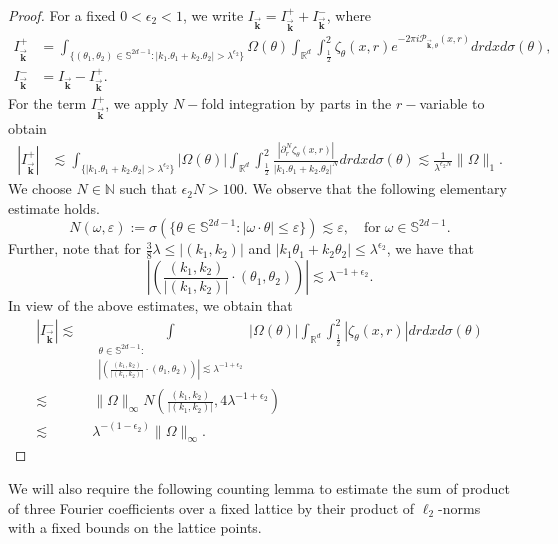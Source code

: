 \documentclass[a4paper,reqno]{amsart}
\newcommand{\R}{{\mathbb R}}       %
\newcommand{\N}{{\mathbb N}}
\newcommand{\Sp}{{\mathbb S}}
\theoremstyle{definition}
\numberwithin{equation}{section}
\begin{document}
\begin{proof}
	For a fixed $0<\epsilon_2<1$, we write $I_{\vec{\mathbf{k}}}=I_{\vec{\mathbf{k}}}^++I_{\vec{\mathbf{k}}}^-$, where
\begin{align*}
	I_{\vec{\mathbf{k}}}^+&=\int_{\{(\theta_1,\theta_2)\in\Sp^{2d-1}:|k_1.\theta_1+k_2.\theta_2|>\lambda^{\epsilon_2}\}}\Omega(\theta)\int_{\R^d}\int_{\frac{1}{2}}^2\zeta_{\theta}(x,r)e^{-2\pi i\mathcal{P}_{\vec{\mathbf{k}},\theta}(x,r)}drdxd\sigma(\theta),\\
	I_{\vec{\mathbf{k}}}^-&=I_{\vec{\mathbf{k}}}-I_{\vec{\mathbf{k}}}^+.
\end{align*}
For the term $I_{\vec{\mathbf{k}}}^+$, we apply $N-$fold integration by parts in the $r-$variable to obtain
\begin{align*}
	\left|I_{\vec{\mathbf{k}}}^+\right|&\lesssim \int_{\{|k_1.\theta_1+k_2.\theta_2|>\lambda^{\epsilon_2}\}}|\Omega(\theta)|\int_{\R^d}\int_{\frac{1}{2}}^2\frac{|\partial_{r}^N\zeta_{\theta}(x,r)|}{|k_1.\theta_1+k_2.\theta_2|^N}drdxd\sigma(\theta)\lesssim \frac{1}{\lambda^{\epsilon_2 N}}\|\Omega\|_1.
\end{align*}
We choose $N\in\N$ such that $\epsilon_2 N>100$.
We observe that the following elementary estimate holds. 
\begin{equation*}
	N(\omega,\varepsilon):=\sigma(\{\theta\in\Sp^{2d-1}:|\omega\cdot\theta|\leq\varepsilon\})\lesssim\varepsilon,\quad \text{for}\;\omega\in\Sp^{2d-1}.
\end{equation*}
Further, note that for $\frac{3}{8}\lambda\leq|(k_1,k_2)|$ and $|k_1\theta_1+k_2\theta_2|\leq\lambda^{\epsilon_2}$, we have that \[\left|\left(\frac{(k_1,k_2)}{|(k_1,k_2)|}\cdot(\theta_1,\theta_2)\right)\right|\lesssim\lambda^{-1+\epsilon_2}.\] 
In view of the above estimates, we obtain that
\begin{align*}
	|I_{\vec{\mathbf{k}}}^-|\lesssim\;&\int\limits_{\substack{\theta\in\Sp^{2d-1}:\\\left|\left(\frac{(k_1,k_2)}{|(k_1,k_2)|}\cdot(\theta_1,\theta_2)\right)\right|\lesssim\lambda^{-1+\epsilon_2}}}|\Omega(\theta)|\int_{\R^d}\int_{\frac{1}{2}}^2|\zeta_{\theta}(x,r)|drdxd\sigma(\theta)\\
	\lesssim\;&\|\Omega\|_\infty N\left(\frac{(k_1,k_2)}{|(k_1,k_2)|},4\lambda^{-1+\epsilon_2}\right)\\
	\lesssim\;&\lambda^{-(1-\epsilon_2)}\|\Omega\|_\infty.
\end{align*}
\end{proof}
We will also require the following counting lemma to estimate the sum of product of three Fourier coefficients over a fixed lattice by their product of $\ell_2$-norms with a fixed bounds on the lattice points.
\end{document}
